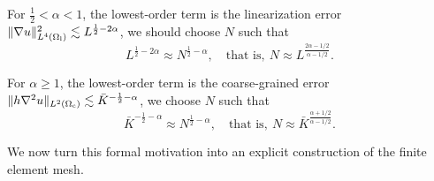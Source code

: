 For $\frac{1}{2}< \alpha< 1$, the lowest-order term is the linearization error $\Vert \nabla u \Vert^{2}_{L^{4}(\Omega_{{\rm l}})}\lesssim L^{\frac{1}{2}-2\alpha}$, we should choose $N$ such that
\begin{equation*}
	L^{\frac{1}{2}-2\alpha}\approx N^{\frac{1}{2}-\alpha}, \quad \text{that is}, \ N\approx L^{\frac{2\alpha-1/2}{\alpha-1/2}}.
\end{equation*}

For $ \alpha\ge 1$, the lowest-order term is the coarse-grained error $\Vert h\nabla^2 u \Vert_{L^{2}(\Omega_{{\rm c}})}\lesssim \bar{K}^{-\frac{1}{2}-\alpha}$, we choose $N$ such that
\begin{equation*}
	\bar{K}^{-\frac{1}{2}-\alpha}\approx N^{\frac{1}{2}-\alpha}, \quad \text{that is}, \ N\approx \bar{K}^{\frac{\alpha+1/2}{\alpha-1/2}}.
\end{equation*}

We now turn this formal motivation into an explicit construction of the finite element mesh. 
	
	

